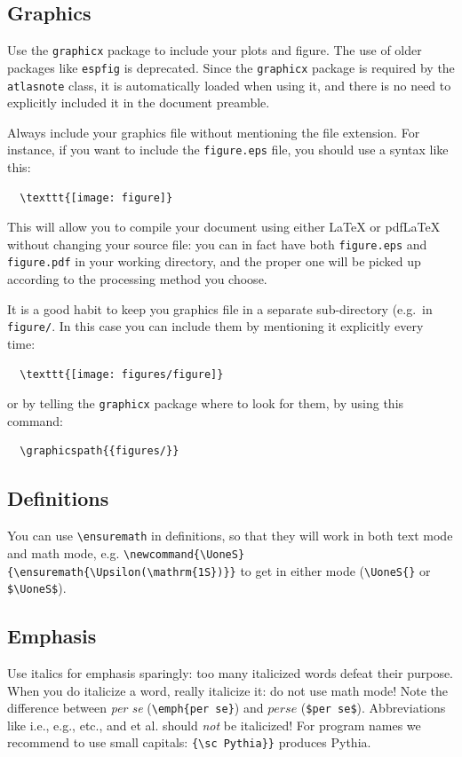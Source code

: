 \documentclass[11pt,a4paper]{../atlasnote}
\begin{document}
\subsection{Graphics}

Use the {\tt graphicx} package \cite{} to include your plots and
figure. The use of older packages like {\tt espfig} is deprecated.
Since the {\tt graphicx} package is required by the {\tt atlasnote}
class, it is automatically loaded when using it, and there is no need
to explicitly included it in the document preamble.

Always include your graphics file without mentioning the file
extension. For instance, if you want to include the \texttt{figure.eps}
file, you should use a syntax like this:
\begin{verbatim}
  \texttt{[image: figure]}
\end{verbatim}
This will allow you to compile your document using either \LaTeX{} or
pdf\LaTeX{} without changing your source file: you can in fact have
both \texttt{figure.eps} and \texttt{figure.pdf} in your working directory,
and the proper one will be picked up according to the processing method
you choose.

It is a good habit to keep you graphics file in a separate
sub-directory (e.g.\ in \texttt{figure/}. In this case you can include them
by mentioning it explicitly every time:
\begin{verbatim}
  \texttt{[image: figures/figure]}
\end{verbatim}
or by telling the \texttt{graphicx} package where to look
for them, by using this command:
\begin{verbatim}
  \graphicspath{{figures/}}
\end{verbatim}


\subsection{Definitions}

You can use \verb|\ensuremath| in definitions, so that they will work
in both text mode and math mode, e.g.
\verb|\newcommand{\UoneS}{\ensuremath{\Upsilon(\mathrm{1S})}}| to get
\UoneS{} in either mode (\verb|\UoneS{}| or \verb|$\UoneS$|).


\subsection{Emphasis}

Use italics for emphasis sparingly: too many italicized words defeat
their purpose. When you do italicize a word, really italicize it: do
not use math mode! Note the difference between \emph{per se}
(\verb|\emph{per se}|) and $per se$ (\verb+$per se$+). Abbreviations
like i.e., e.g., etc., and et al. should \emph{not} be italicized!
For program names we recommend to use small capitals:
\verb|{\sc Pythia}}| produces {\sc Pythia}.
\end{document}
